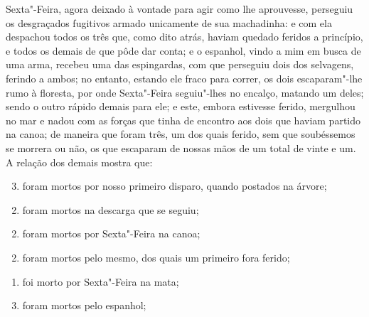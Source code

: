 Sexta"-Feira, agora deixado à vontade para agir como lhe aprouvesse,
perseguiu os desgraçados fugitivos armado unicamente de sua machadinha:
e com ela despachou todos os três que, como dito atrás, haviam quedado
feridos a princípio, e todos os demais de que pôde dar conta; e o
espanhol, vindo a mim em busca de uma arma, recebeu uma das espingardas,
com que perseguiu dois dos selvagens, ferindo a ambos; no entanto,
estando ele fraco para correr, os dois escaparam"-lhe rumo à floresta,
por onde Sexta"-Feira seguiu"-lhes no encalço, matando um deles; sendo o
outro rápido demais para ele; e este, embora estivesse ferido, mergulhou
no mar e nadou com as forças que tinha de encontro aos dois que haviam
partido na canoa; de maneira que foram três, um dos quais ferido, sem
que soubéssemos se morrera ou não, os que escaparam de nossas mãos de um
total de vinte e um. A relação dos demais mostra que:

\begin{enumerate}[label=\arabic*]
\setcounter{enumi}{2}
\item foram mortos por nosso primeiro disparo, quando postados na árvore;
\end{enumerate}

\begin{enumerate}[label=\arabic*]
\setcounter{enumi}{1}
\item foram mortos na descarga que se seguiu;
\end{enumerate}

\begin{enumerate}[label=\arabic*]
\setcounter{enumi}{1}
\item foram mortos por Sexta"-Feira na canoa;
\end{enumerate}

\begin{enumerate}[label=\arabic*]
\setcounter{enumi}{1}
\item foram mortos pelo mesmo, dos quais um primeiro fora ferido;
\end{enumerate}

\begin{enumerate}[label=\arabic*]
\item foi morto por Sexta"-Feira na mata;
\end{enumerate}

\begin{enumerate}[label=\arabic*]
\setcounter{enumi}{2}
\item foram mortos pelo espanhol;
\end{enumerate}

